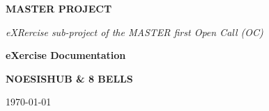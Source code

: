 \thispagestyle{empty}
\begin{center}
\vspace*{4cm}

{\Huge \textbf{MASTER PROJECT}}

\vspace{0.5cm}

{\Large \textit{eXRercise sub-project of the MASTER first Open Call (OC)}}

\vspace{2cm}

{\LARGE \textbf{eXercise Documentation}}

\vspace{1cm}

\Large \textbf{NOESISHUB \& 8 BELLS}

\vspace{2cm}

\large \today

\end{center}

\newpage